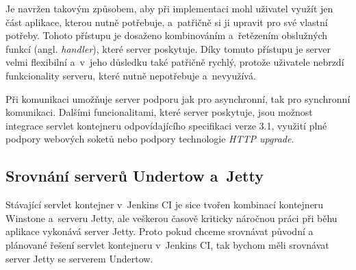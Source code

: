            Je navržen takovým způsobem, aby při implementaci mohl uživatel využít
            jen část aplikace, kterou nutně potřebuje, a~patřičně si ji upravit
            pro své vlastní potřeby.
            Tohoto přístupu je dosaženo kombinováním a~řetězením
            obslužných funkcí (angl. \emph{handler}), které server poskytuje.
            Díky tomuto přístupu je server velmi flexibilní a~v~jeho důsledku
            také patřičně rychlý, protože uživatele nebrzdí funkcionality
            serveru, které nutně nepotřebuje a~nevyužívá.
            
            Při komunikaci umožňuje server podporu jak pro asynchronní, tak
            pro synchronní komunikaci.
            Dalšími funcionalitami, které server poskytuje, jsou možnost integrace
            servlet kontejneru odpovídajícího specifikaci verze 3.1,
            využití plné podpory webových soketů nebo 
            podpory technologie \emph{HTTP upgrade}.

        

 
        
        \subsection{Srovnání serverů Undertow a~Jetty}\label{srovnani}
            Stávající servlet kontejner v~Jenkins CI je sice tvořen
            kombinací kontejneru Winstone a~serveru Jetty, ale veškerou
            časově kriticky náročnou práci při běhu aplikace vykonává server
            Jetty. Proto pokud chceme srovnávat původní a plánované řešení servlet kontejneru
            v~Jenkins CI, tak bychom měli srovnávat server Jetty se serverem Undertow.

